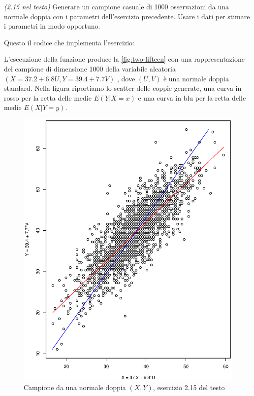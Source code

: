 \begin{exercise}\emph{(2.15 nel testo)}
  Generare un campione casuale di 1000 osservazioni da una normale
  doppia con i parametri dell'esercizio precedente. Usare i dati per
  stimare i parametri in modo opportuno.
\end{exercise}
Questo il codice che implementa l'esercizio:

L'esecuzione della funzione produce la \autoref{fig:two-fifteen} con
una rappresentazione del campione di dimensione 1000 della variabile
aleatoria $(X = 37.2 + 6.8U, Y = 39.4 + 7.7V)$ , dove $(U, V)$ \`e una
normale doppia standard. Nella figura riportiamo lo scatter delle
coppie generate, una curva in rosso per la retta delle medie
$E(Y|X=x)$ e una curva in blu per la retta delle medie $E(X|Y=y)$.
\begin{figure}[htb]
\centering
\includegraphics[height=14cm,width=14cm]{r-sources/exercises/chapter-two/two-fifteen.ps}
\caption{Campione da una normale doppia $(X, Y)$, esercizio 2.15 del testo}
\label{fig:two-fifteen}
\end{figure}

